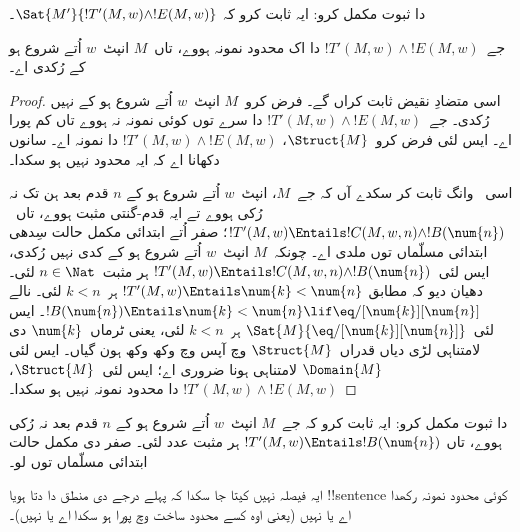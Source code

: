 \documentclass[../../../include/open-logic-section]{subfiles}
\begin{document}
\begin{prob}
  دا ثبوت مکمل کرو: ایہ ثابت کرو کہ
  $\Sat{M'}{!T'(M,w) \land !E(M,w)}$۔
\end{prob}

\begin{lem}
  جے~$!T'(M,w) \land !E(M,w)$ دا
  اک محدود نمونہ ہووے، تاں~$M$
  انپٹ~$w$ اُتے شروع ہو کے رُکدی اے۔
\end{lem}

\begin{proof}
  اسی متضادِ نقیض ثابت کراں گے۔
  فرض کرو~$M$ انپٹ~$w$ اُتے شروع ہو
  کے نہیں رُکدی۔ جے~$!T'(M,w) \land
  !E(M,w)$ دا سرے توں کوئی نمونہ
  نہ ہووے تاں کم پورا اے۔ ایس لئی
  فرض کرو~$\Struct{M}$،
  $!T'(M,w) \land !E(M, w)$ دا نمونہ
  اے۔ سانوں دکھانا اے کہ ایہ محدود
  نہیں ہو سکدا۔
  
  اسی~ وانگ
  ثابت کر سکدے آں کہ جے~$M$،
  انپٹ~$w$ اُتے شروع ہو کے
  $n$ قدم بعد ہن تک نہ رُکی ہووے
  تے ایہ قدم-گنتی مثبت ہووے،
  تاں~$!T'(M,w)
  \Entails !C(M, w, n) \land
  !B(\num{n})$؛ صفر اُتے ابتدائی
  مکمل حالت سِدھی ابتدائی مسلّماں
  توں ملدی اے۔ چونکہ~$M$ انپٹ~$w$
  اُتے شروع ہو کے کدی نہیں رُکدی،
  ایس لئی~$!T'(M,w) \Entails !C(M, w, n) \land
  !B(\num{n})$ ہر مثبت~$n \in \Nat$
  لئی۔ دھیان دیو کہ
   مطابق
  $!T'(M,w) \Entails \num{k} < \num{n}$
  ہر~$k < n$ لئی۔ نالے
  $!B(\num{n}) \Entails \num{k} < \num{n} \lif
  \eq/[\num{k}][\num{n}]$۔
  ایس لئی~$\Sat{M}{\eq/[\num{k}][\num{n}]}$
  ہر~$k < n$ لئی،
  یعنی ٹرماں~$\num{k}$ دی لامتناہی
  لڑی دیاں قدراں~$\Struct{M}$ وچ
  آپس وچ وکھ وکھ ہون گیاں۔ ایس لئی
  $\Domain{M}$ لامتناہی ہونا
  ضروری اے؛ ایس لئی~$\Struct{M}$،
  $!T'(M,w) \land !E(M, w)$
  دا محدود نمونہ نہیں ہو سکدا۔
\end{proof}

\begin{prob}
  دا ثبوت مکمل کرو: ایہ ثابت کرو کہ
  جے~$M$ انپٹ~$w$ اُتے شروع ہو کے
  $n$ قدم بعد نہ رُکی ہووے، تاں
  $!T'(M,w) \Entails !B(\num{n})$
  ہر مثبت عدد لئی۔ صفر دی
  مکمل حالت ابتدائی مسلّماں توں لو۔
\end{prob}

\begin{thm}
  ایہ فیصلہ نہیں کیتا جا سکدا کہ
  پہلے درجے دی منطق دا دتا ہویا
  !!{sentence} کوئی محدود نمونہ رکھدا اے
  یا نہیں (یعنی اوہ کسے محدود
  ساخت وچ پورا ہو سکدا اے یا نہیں)۔
\end{thm}
\end{document}
